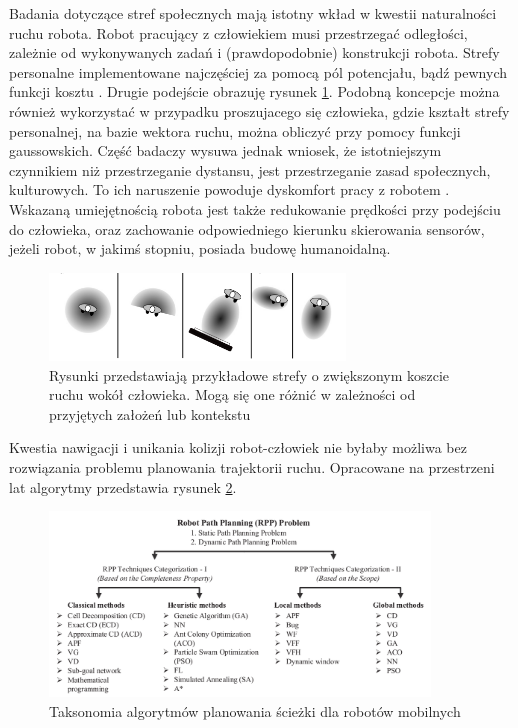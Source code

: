 Badania dotyczące stref społecznych mają istotny wkład w kwestii naturalności ruchu robota. Robot pracujący z człowiekiem musi przestrzegać odległości, zależnie od wykonywanych zadań i (prawdopodobnie) konstrukcji robota. Strefy personalne implementowane najczęściej za pomocą pól potencjału, bądź pewnych funkcji kosztu \cite{survey}. Drugie podejście obrazuję rysunek \ref{fig:cost_zones}. Podobną koncepcje można również wykorzystać w przypadku proszujacego się człowieka, gdzie kształt strefy personalnej, na bazie wektora ruchu, można obliczyć przy pomocy funkcji gaussowskich\cite{nrs}. Część badaczy wysuwa jednak wniosek, że istotniejszym czynnikiem niż przestrzeganie dystansu, jest przestrzeganie zasad społecznych, kulturowych. To ich naruszenie powoduje dyskomfort pracy z robotem \cite{survey}\cite{survey_2}. Wskazaną umiejętnością robota jest także redukowanie prędkości przy podejściu do człowieka, oraz zachowanie odpowiedniego kierunku skierowania sensorów, jeżeli robot, w jakimś stopniu, posiada budowę humanoidalną.

\begin{figure}[H]
	\centering
	\includegraphics[width=0.7\textwidth]{gfx/cost_zone.png}
	\caption{Rysunki przedstawiają przykładowe strefy o zwiększonym koszcie ruchu wokół człowieka. Mogą się one różnić w zależności od przyjętych założeń lub kontekstu\cite{survey}}
	\label{fig:cost_zones}
\end{figure}

Kwestia nawigacji i unikania kolizji robot-człowiek nie byłaby możliwa bez rozwiązania problemu planowania trajektorii ruchu. Opracowane na przestrzeni lat algorytmy przedstawia rysunek \ref{fig:taxonomy}.

\begin{figure}[H]
	\centering
	\includegraphics[width=0.9\textwidth]{gfx/taksonomia_planery.png}
	\caption{Taksonomia algorytmów planowania ścieżki dla robotów mobilnych\cite{taxonomy}}
	\label{fig:taxonomy}
\end{figure}

